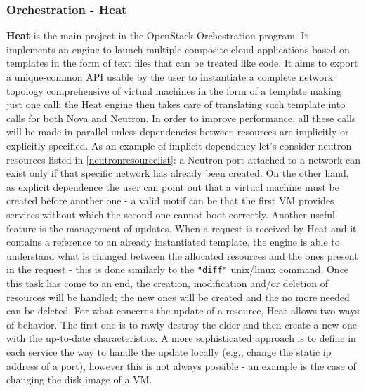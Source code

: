 \subsubsection{Orchestration - Heat}
\textbf{Heat} is the main project in the OpenStack Orchestration program. It implements an engine to launch multiple composite cloud applications based on templates in the form of text files that can be treated like code. It aims to export a unique-common API usable by the user to instantiate a complete network topology comprehensive of virtual machines in the form of a template making just one call; the Heat engine then takes care of translating such template into calls for both Nova and Neutron. In order to improve performance, all these calls will be made in parallel unless dependencies between resources are implicitly or explicitly specified. As an example of implicit dependency let's consider neutron resources listed in \ref{neutronresourcelist}: a Neutron port attached to a network can exist only if that specific network has already been created.
On the other hand, as explicit dependence the user can point out that a virtual machine must be created before another one - a valid motif can be that the first VM provides services without which the second one cannot boot correctly.
Another useful feature is the management of updates.
When a request is received by Heat and it contains a reference to an already instantiated template, the engine is able to understand what is changed between the allocated resources and the ones present in the request - this is done similarly to the \texttt{"diff"} unix/linux command.
Once this task has come to an end, the creation, modification and/or deletion of resources will be handled; the new ones will be created and the no more needed can be deleted.
For what concerns the update of a resource, Heat allows two ways of behavior. The first one is to rawly destroy the elder and then create a new one with the up-to-date characteristics. A more sophisticated approach is to define in each service the way to handle the update locally (e.g., change the static ip address of a port), however this is not always possible - an example is the case of changing the disk image of a VM.

